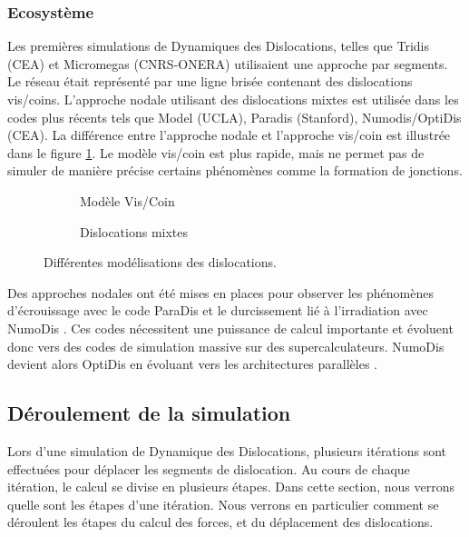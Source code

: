 \documentclass[11pt,class=article,float=false,crop=false]{standalone}
\begin{document}
\subsubsection{Ecosystème}

Les premières simulations de Dynamiques des Dislocations, telles que Tridis (CEA) et Micromegas (CNRS-ONERA) utilisaient une approche par segments. Le réseau était représenté par une ligne brisée contenant des dislocations vis/coins. L'approche nodale utilisant des dislocations mixtes  est utilisée dans les codes plus récents tels que Model (UCLA), Paradis (Stanford), Numodis/OptiDis (CEA). La différence entre l'approche nodale et l'approche vis/coin est illustrée dans le figure \ref{fig:modelisation_vis_coin}. Le modèle vis/coin est plus rapide, mais ne permet pas de simuler de manière précise certains phénomènes comme la formation de jonctions.

\begin{figure}[H]
	\centering
	\begin{subfigure}[b]{0.49\textwidth}
		\centering
		\caption{Modèle Vis/Coin}
	\end{subfigure}
	\begin{subfigure}[b]{0.49\textwidth}
		\centering
		\caption{Dislocations mixtes}
	\end{subfigure}
	\caption{Différentes modélisations des dislocations.}
	\label{fig:modelisation_vis_coin}
\end{figure}

Des approches nodales ont été mises en places pour observer les phénomènes d'écrouissage avec le code ParaDis  et le durcissement lié à l'irradiation avec NumoDis . Ces codes nécessitent une puissance de calcul importante et évoluent donc vers des codes de simulation massive sur des supercalculateurs. NumoDis devient alors OptiDis en évoluant vers les architectures parallèles .

\subsection{Déroulement de la simulation}
\label{sec:etapes_simulation}

Lors d'une simulation de Dynamique des Dislocations, plusieurs itérations sont effectuées pour déplacer les segments de dislocation. Au cours de chaque itération, le calcul se divise en plusieurs étapes. Dans cette section, nous verrons quelle sont les étapes d'une itération. Nous verrons en particulier comment se déroulent les étapes du calcul des forces, et du déplacement des dislocations.
\end{document}
